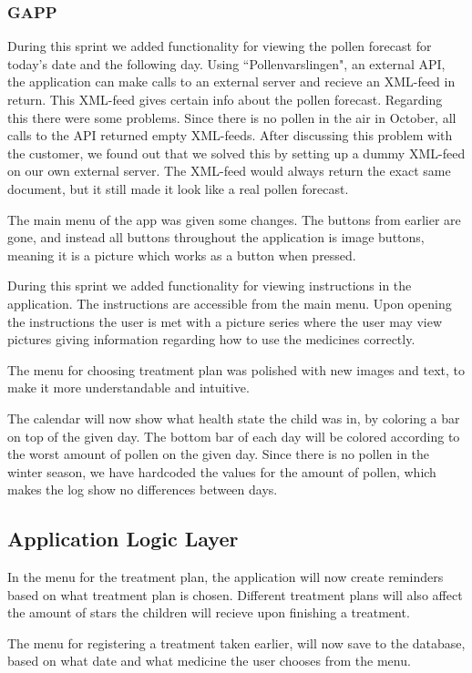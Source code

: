 \subsubsection{GAPP}
During this sprint we added functionality for viewing the pollen forecast for today's date and 
the following day. Using ``Pollenvarslingen", an external API, the application can make calls to an external server 
and recieve an XML-feed in return. This XML-feed gives certain info about the pollen forecast. 
Regarding this there were some problems. Since there is no pollen in the air in October, all 
calls to the API returned empty XML-feeds. After discussing this problem with the customer, we 
found out that we solved this by setting up a dummy XML-feed on our own external server. The 
XML-feed would always return the exact same document, but it still made it look like a real 
pollen forecast.

The main menu of the app was given some changes. The buttons from earlier are gone, and instead 
all buttons throughout the application is image buttons, meaning it is a picture which works as 
a button when pressed. 

During this sprint we added functionality for viewing instructions in the application. The 
instructions are accessible from the main menu. Upon opening the instructions the user is met with 
a picture series where the user may view pictures giving information regarding how to use the 
medicines correctly.

The menu for choosing treatment plan was polished with new images and text, to make it more 
understandable and intuitive. 

The calendar will now show what health state the child was in, by coloring a bar on top of the 
given day. The bottom bar of each day will be colored according to the worst amount of pollen on 
the given day. Since there is no pollen in the winter season, we have hardcoded the values for the 
amount of pollen, which makes the log show no differences between days.

\subsection{Application Logic Layer}
In the menu for the treatment plan, the application will now create reminders based on what 
treatment plan is chosen. Different treatment plans will also affect the amount of stars the 
children will recieve upon finishing a treatment.

The menu for registering a treatment taken earlier, will now save to the database, based on what 
date and what medicine the user chooses from the menu.

